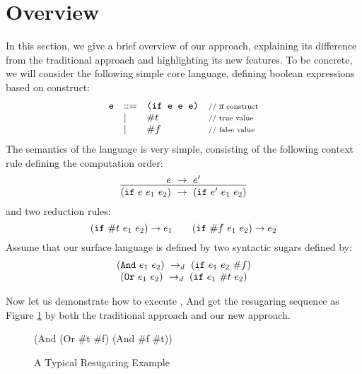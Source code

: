 \section{Overview}
\label{sec2}

In this section, we give a brief overview of our approach, explaining its difference from the traditional approach and highlighting its new features. To be concrete, we will consider the following simple core language, defining boolean expressions based on  construct:
\[
\begin{array}{lllll}
\mbox{\tt e} &::=& \texttt{(if~e~e~e)} &\mbox{{\scriptsize // if construct}}\\
& |& \#t  & \mbox{{\scriptsize // true value}}\\
& |& \#f & \mbox{{\scriptsize // false value}}
\end{array}
\]
The semantics of the language is very simple, consisting of the following context rule defining the computation order:
\[
\centering
\infer
{(\m{if}~e~e_1~e_2)~\rightarrow~(\m{if}~e'~e_1~e_2)}
{e~\rightarrow~e'}
\]
and two reduction rules:
\[
\centering
(\m{if}~\#t~e_1~e_2) \rightarrow e_1 \qquad (\m{if}~\#f~e_1~e_2) \rightarrow e_2
\]
Assume that our surface language is defined by two syntactic sugars defined by:
\[
\begin{array}{c}
(\mbox{\tt And}~e_1~e_2) ~\rightarrow_d~ (\mbox{\tt if}~e_1~e_2~\#f)\\
(\mbox{\tt Or}~e_1~e_2) ~\rightarrow_d~ (\mbox{\tt if}~e_1~\#t~e_2)
\end{array}
\]


Now let us demonstrate how to execute , And get the resugaring sequence as Figure \ref{fig:standard} by both the traditional approach and our new approach.

\begin{figure}[t]
\begin{center}
\begin{minipage}{6cm}
\begin{scriptsize}
\begin{Codes}
    (And (Or \#t \#f) (And \#f \#t))
\end{Codes}
\end{scriptsize}
\end{minipage}
\end{center}
\caption{A Typical Resugaring Example}
\label{fig:standard}
\end{figure}




